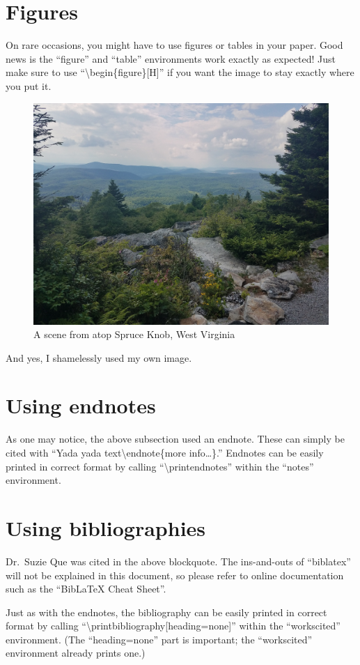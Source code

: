 \documentclass[mla8]{mla}
\begin{document}
\begin{paper}
\section{Figures}

On rare occasions, you might have to use figures or tables
in your paper.
Good news is the ``figure'' and ``table'' environments
work exactly as expected!
Just make sure to use ``\textbackslash{}begin\{figure\}[H]''
if you want the image to stay exactly where you put it.
\begin{figure}[H]
\includegraphics[width=0.5\linewidth]{mla-example-image}
\caption{A scene from atop Spruce Knob, West Virginia}
\end{figure}
And yes, I shamelessly used my own image.

\section{Using endnotes}

As one may notice, the above subsection used an endnote.
These can simply be cited with
``Yada yada text\textbackslash{}endnote\{more info\ldots\}.''
Endnotes can be easily printed in correct format by calling
``\textbackslash{}printendnotes'' within the
``notes'' environment.

\section{Using bibliographies}

Dr.\ Suzie Que was cited in the above blockquote.
The ins-and-outs of ``biblatex'' will not be explained in this
document, so please refer to online documentation such as the
``BibLaTeX Cheat Sheet''.

Just as with the endnotes,
the bibliography can be easily printed in correct format by calling
``\textbackslash{}printbibliography[heading=none]'' within the
``workscited'' environment.
(The ``heading=none'' part is important; the ``workscited'' environment
already prints one.)

\end{paper}

\begin{notes}

\printendnotes

\end{notes}

\begin{workscited}

\printbibliography[heading=none]

\end{workscited}
\end{document}
